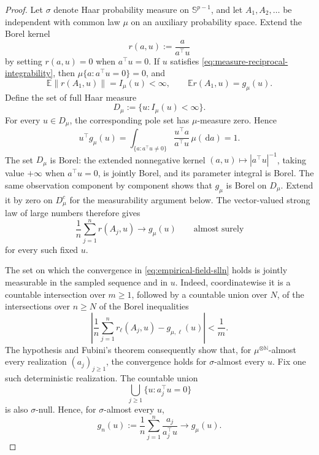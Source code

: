 \documentclass[11pt]{article}
\numberwithin{equation}{section}
\theoremstyle{thmstyleone}%
\theoremstyle{thmstyletwo}%
\let\cref\autoref
\newcommand{\E}{\mathbb E}
\newcommand{\sphere}{\mathbb S}
\newcommand{\dd}{\,\mathrm d}
\begin{document}
\begin{proof}
Let \(\sigma\) denote Haar probability measure on
\(\sphere^{p-1}\), and let \(A_1,A_2,\ldots\) be independent with common law
\(\mu\) on an auxiliary probability space.  Extend the Borel kernel
\[
  r(a,u):=\frac{a}{a^\top u}
\]
by setting \(r(a,u)=0\) when \(a^\top u=0\).  If \(u\) satisfies
\cref{eq:measure-reciprocal-integrability}, then
\(\mu\{a:a^\top u=0\}=0\), and
\[
  \E\|r(A_1,u)\|=I_\mu(u)<\infty,
  \qquad
  \E r(A_1,u)=g_\mu(u).
\]
Define the set of full Haar measure
\[
  D_\mu:=\{u:I_\mu(u)<\infty\}.
\]
For every \(u\in D_\mu\), the corresponding pole set has
\(\mu\)-measure zero.  Hence
\begin{equation}
  u^\top g_\mu(u)
  =
  \int_{\{a:a^\top u\neq0\}}
  \frac{u^\top a}{a^\top u}\,\mu(\dd a)
  =1.
  \label{eq:measure-euler-pairing}
\end{equation}
The set \(D_\mu\) is Borel: the extended nonnegative kernel
\((a,u)\mapsto |a^\top u|^{-1}\), taking value \(+\infty\) when
\(a^\top u=0\), is jointly Borel, and its parameter integral is Borel.  The
same observation component by component shows that
\(g_\mu\) is Borel on \(D_\mu\).  Extend it by zero on \(D_\mu^c\) for the
measurability argument below.
The vector-valued strong law of large numbers therefore gives
\begin{equation}
  \frac1n\sum_{j=1}^n r(A_j,u)
  \longrightarrow g_\mu(u)
  \qquad\text{almost surely}
  \label{eq:empirical-field-slln}
\end{equation}
for every such fixed \(u\).

The set on which the convergence in
\cref{eq:empirical-field-slln} holds is jointly measurable in the sampled
sequence and in \(u\).  Indeed, coordinatewise it is a countable
intersection over \(m\geq1\), followed by a countable union over \(N\), of
the intersections over \(n\geq N\) of the Borel inequalities
\[
  \left|
    \frac1n\sum_{j=1}^n r_\ell(A_j,u)-g_{\mu,\ell}(u)
  \right|<\frac1m .
\]
The hypothesis and Fubini's theorem consequently
show that, for \(\mu^{\otimes\mathbb N}\)-almost every realization
\((a_j)_{j\geq1}\), the convergence holds for
\(\sigma\)-almost every \(u\).  Fix one such deterministic realization.  The
countable union
\[
  \bigcup_{j\geq1}\{u:a_j^\top u=0\}
\]
is also \(\sigma\)-null.  Hence, for \(\sigma\)-almost every \(u\),
\begin{equation}
  g_n(u)
  :=
  \frac1n\sum_{j=1}^n\frac{a_j}{a_j^\top u}
  \longrightarrow g_\mu(u).
  \label{eq:empirical-field-convergence}
\end{equation}


\end{proof}
\end{document}
